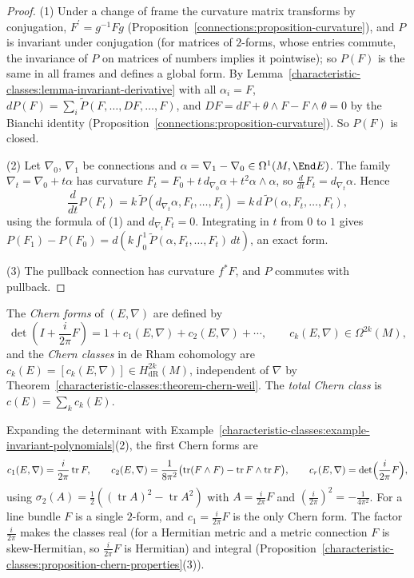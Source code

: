 \begin{proof}
(1) Under a change of frame the curvature matrix transforms by conjugation, $F^{\prime} = g^{-1}Fg$ (Proposition~\ref{connections:proposition-curvature}), and $P$ is invariant under
conjugation (for matrices of $2$-forms, whose entries commute, the invariance of $P$ on matrices of numbers implies it pointwise); so $P(F)$ is the same in all frames and defines a
global form. By Lemma~\ref{characteristic-classes:lemma-invariant-derivative} with all $\alpha_i = F$, $dP(F) = \sum_i\tilde P(F, \ldots, DF, \ldots, F)$, and $DF = dF + \theta \wedge F - F \wedge \theta = 0$
by the Bianchi identity (Proposition~\ref{connections:proposition-curvature}). So $P(F)$ is closed.

(2) Let $\nabla_0$, $\nabla_1$ be connections and $\alpha = \nabla_1 - \nabla_0 \in \Omega^1(M, \End E)$. The family $\nabla_t = \nabla_0 + t\alpha$ has curvature $F_t = F_0 + t\,d_{\nabla_0}\alpha + t^2\alpha \wedge \alpha$, so
$\frac{d}{dt}F_t = d_{\nabla_t}\alpha$. Hence
\[
\frac{d}{dt}P(F_t) = k\,\tilde{P}(d_{\nabla_t}\alpha, F_t, \ldots, F_t) = k\,d\,\tilde{P}(\alpha, F_t, \ldots, F_t),
\]
using the formula of (1) and $d_{\nabla_t}F_t = 0$. Integrating in $t$ from $0$ to $1$ gives $P(F_1) - P(F_0) = d\left(k\int_0^1\tilde{P}(\alpha, F_t, \ldots, F_t)\,dt\right)$, an exact form.

(3) The pullback connection has curvature $f^*F$, and $P$ commutes with pullback.
\end{proof}

\begin{definition}\label{characteristic-classes:definition-chern-forms}
The \emph{Chern forms} of $(E, \nabla)$ are defined by
\[
\det\left(I + \frac{i}{2\pi}F\right) = 1 + c_1(E, \nabla) + c_2(E, \nabla) + \cdots, \qquad c_k(E, \nabla) \in \Omega^{2k}(M),
\]
and the \emph{Chern classes} in de Rham cohomology are $c_k(E) = [c_k(E, \nabla)] \in H^{2k}_{\mathrm{dR}}(M)$, independent of $\nabla$ by Theorem~\ref{characteristic-classes:theorem-chern-weil}. The
\emph{total Chern class} is $c(E) = \sum_kc_k(E)$.
\end{definition}

Expanding the determinant with Example~\ref{characteristic-classes:example-invariant-polynomials}(2), the first Chern forms are
\[
c_1(E, \nabla) = \frac{i}{2\pi}\operatorname{tr}F, \qquad c_2(E, \nabla) = \frac{1}{8\pi^2}\bigl(\operatorname{tr}(F \wedge F) - \operatorname{tr}F \wedge \operatorname{tr}F\bigr), \qquad
c_r(E, \nabla) = \det\Bigl(\frac{i}{2\pi}F\Bigr),
\]
using $\sigma_2(A) = \frac12((\operatorname{tr}A)^2 - \operatorname{tr}A^2)$ with $A = \frac{i}{2\pi}F$ and $(\frac{i}{2\pi})^2 = -\frac{1}{4\pi^2}$. For a line bundle $F$ is a single $2$-form, and
$c_1 = \frac{i}{2\pi}F$ is the only Chern form. The factor $\frac{i}{2\pi}$ makes the classes real (for a Hermitian metric and a metric connection $F$ is skew-Hermitian, so
$\frac{i}{2\pi}F$ is Hermitian) and integral (Proposition~\ref{characteristic-classes:proposition-chern-properties}(3)).

